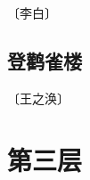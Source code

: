 \documentclass[12pt,UTF-8,openany]{ctexbook}
\begin{document}
\begin{center}
    \vspace{10pt}
    
    \begin{normalsize}
        
        〔李白〕
        
    \end{normalsize}
    
    \vspace{8pt}
    
    \begin{large}
        
        
        
    \end{large}
    
\end{center}

\vspace{8pt}


\section{登鹳雀楼}

\begin{center}
    \vspace{10pt}
    
    \begin{normalsize}
        
        〔王之涣〕
        
    \end{normalsize}
    
    \vspace{8pt}
    
    \begin{large}
        
        
        
    \end{large}
    
\end{center}

\vspace{8pt}


\chapter{第三层}
\end{document}
